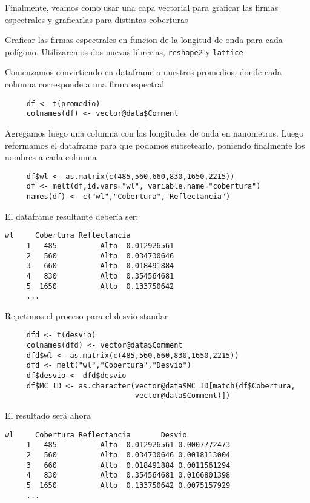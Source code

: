 Finalmente, veamos como usar una capa vectorial para graficar las
firmas espectrales y graficarlas para distintas coberturas

\begin{exa}
     Graficar las firmas espectrales en funcion de la longitud de onda para cada
     pol\'igono. Utilizaremos dos nuevas librerias,
     \texttt{reshape2} y \texttt{lattice}

     Comenzamos convirtiendo en dataframe a nuestros promedios, donde cada
     columna corresponde a una firma espectral
     \begin{lstlisting}
     df <- t(promedio)
     colnames(df) <- vector@data$Comment
     \end{lstlisting}
     Agregamos luego una columna con las longitudes de onda en nanometros. Luego
     reformamos el dataframe para que podamos subsetearlo, poniendo finalmente
     los nombres a cada columna
     \begin{lstlisting}
     df$wl <- as.matrix(c(485,560,660,830,1650,2215))
     df <- melt(df,id.vars="wl", variable.name="cobertura")
     names(df) <- c("wl","Cobertura","Reflectancia")
     \end{lstlisting}
     El dataframe resultante deber\'ia ser:
     \begin{Verbatim}[fontsize=\small]
          wl     Cobertura Reflectancia
     1   485          Alto  0.012926561
     2   560          Alto  0.034730646
     3   660          Alto  0.018491884
     4   830          Alto  0.354564681
     5  1650          Alto  0.133750642
     ...
     \end{Verbatim}
     Repetimos el proceso para el desvio standar
     \begin{lstlisting}
     dfd <- t(desvio)
     colnames(dfd) <- vector@data$Comment
     dfd$wl <- as.matrix(c(485,560,660,830,1650,2215))
     dfd <- melt("wl","Cobertura","Desvio")
     df$desvio <- dfd$desvio
     df$MC_ID <- as.character(vector@data$MC_ID[match(df$Cobertura,
                              vector@data$Comment)])
     \end{lstlisting}
     El resultado ser\'a ahora
     \begin{Verbatim}[fontsize=\small]
          wl     Cobertura Reflectancia       Desvio
     1   485          Alto  0.012926561 0.0007772473
     2   560          Alto  0.034730646 0.0018113004
     3   660          Alto  0.018491884 0.0011561294
     4   830          Alto  0.354564681 0.0166801398
     5  1650          Alto  0.133750642 0.0075157929
     ...
     \end{Verbatim}

\end{exa}
